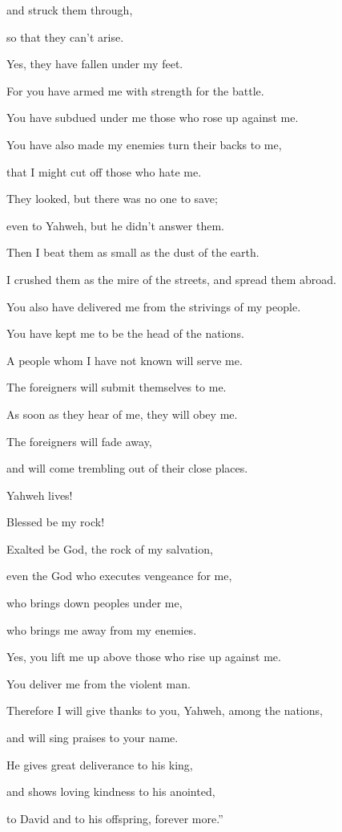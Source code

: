 {\par }{\QB and struck them through,
\par }{\QB so that they can’t arise.
\par }{\QB Yes, they have fallen under my feet.
\par }{\Q {}For you have armed me with strength for the battle.
\par }{\QB You have subdued under me those who rose up against me.
\par }{\Q {}You have also made my enemies turn their backs to me,
\par }{\QB that I might cut off those who hate me.
\par }{\Q {}They looked, but there was no one to save;
\par }{\QB even to Yahweh, but he didn’t answer them.
\par }{\Q {}Then I beat them as small as the dust of the earth.
\par }{\QB I crushed them as the mire of the streets, and spread them abroad.
\par }{\Q {}You also have delivered me from the strivings of my people.
\par }{\QB You have kept me to be the head of the nations.
\par }{\QB A people whom I have not known will serve me.
\par }{\Q {}The foreigners will submit themselves to me.
\par }{\QB As soon as they hear of me, they will obey me.
\par }{\Q {}The foreigners will fade away,
\par }{\QB and will come trembling out of their close places.
\par }{\Q {}Yahweh lives!
\par }{\QB Blessed be my rock!
\par }{\Q Exalted be God, the rock of my salvation,
\par }{\QB {}even the God who executes vengeance for me,
\par }{\QB who brings down peoples under me,
\par }{\QB {}who brings me away from my enemies.
\par }{\Q Yes, you lift me up above those who rise up against me.
\par }{\QB You deliver me from the violent man.
\par }{\Q {}Therefore I will give thanks to you, Yahweh, among the nations,
\par }{\QB and will sing praises to your name.
\par }{\Q {}He gives great deliverance to his king,
\par }{\QB and shows loving kindness to his anointed,
\par }{\QB to David and to his offspring, forever more.”

}
